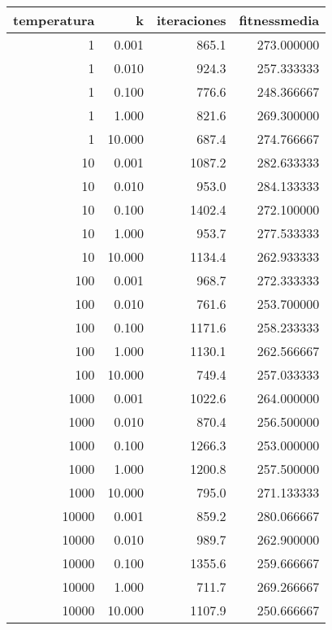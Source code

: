\begin{tabular}{rrrr}
\toprule
 temperatura &       k &  iteraciones &  fitnessmedia \\
\midrule
           1 &   0.001 &        865.1 &    273.000000 \\
           1 &   0.010 &        924.3 &    257.333333 \\
           1 &   0.100 &        776.6 &    248.366667 \\
           1 &   1.000 &        821.6 &    269.300000 \\
           1 &  10.000 &        687.4 &    274.766667 \\
          10 &   0.001 &       1087.2 &    282.633333 \\
          10 &   0.010 &        953.0 &    284.133333 \\
          10 &   0.100 &       1402.4 &    272.100000 \\
          10 &   1.000 &        953.7 &    277.533333 \\
          10 &  10.000 &       1134.4 &    262.933333 \\
         100 &   0.001 &        968.7 &    272.333333 \\
         100 &   0.010 &        761.6 &    253.700000 \\
         100 &   0.100 &       1171.6 &    258.233333 \\
         100 &   1.000 &       1130.1 &    262.566667 \\
         100 &  10.000 &        749.4 &    257.033333 \\
        1000 &   0.001 &       1022.6 &    264.000000 \\
        1000 &   0.010 &        870.4 &    256.500000 \\
        1000 &   0.100 &       1266.3 &    253.000000 \\
        1000 &   1.000 &       1200.8 &    257.500000 \\
        1000 &  10.000 &        795.0 &    271.133333 \\
       10000 &   0.001 &        859.2 &    280.066667 \\
       10000 &   0.010 &        989.7 &    262.900000 \\
       10000 &   0.100 &       1355.6 &    259.666667 \\
       10000 &   1.000 &        711.7 &    269.266667 \\
       10000 &  10.000 &       1107.9 &    250.666667 \\
\bottomrule
\end{tabular}
